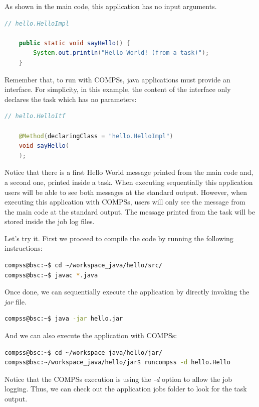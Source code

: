 As shown in the main code, this application has no input arguments. 

\begin{lstlisting}[language=java]
	// hello.HelloImpl
	
	public static void sayHello() {
		System.out.println("Hello World! (from a task)");
	}
\end{lstlisting}

Remember that, to run with COMPSs, java applications must provide an interface. For simplicity, in this example, the content of the interface only
declares the task which has no parameters:
\begin{lstlisting}[language=java]
	// hello.HelloItf
	
	@Method(declaringClass = "hello.HelloImpl")
	void sayHello(
	);
\end{lstlisting}

Notice that there is a first Hello World message printed from the main code and, a second one, printed inside a task. When executing sequentially
this application users will be able to see both messages at the standard output. However, when executing this application with COMPSs, users will only
see the message from the main code at the standard output. The message printed from the task will be stored inside the job log files. 

Let's try it. First we proceed to compile the code by running the following instructions:

\begin{lstlisting}[language=bash]
compss@bsc:~$ cd ~/workspace_java/hello/src/
compss@bsc:~$ javac *.java

\end{lstlisting}

Once done, we can sequentially execute the application by directly invoking the \textit{jar} file.

\begin{lstlisting}[language=bash]
compss@bsc:~$ java -jar hello.jar
\end{lstlisting}

And we can also execute the application with COMPSs:

\begin{lstlisting}[language=bash]
compss@bsc:~$ cd ~/workspace_java/hello/jar/
compss@bsc:~/workspace_java/hello/jar$ runcompss -d hello.Hello 
\end{lstlisting}

Notice that the COMPSs execution is using the \textit{-d} option to allow the job logging. Thus, we can check out the application jobs folder to look for
the task output.

